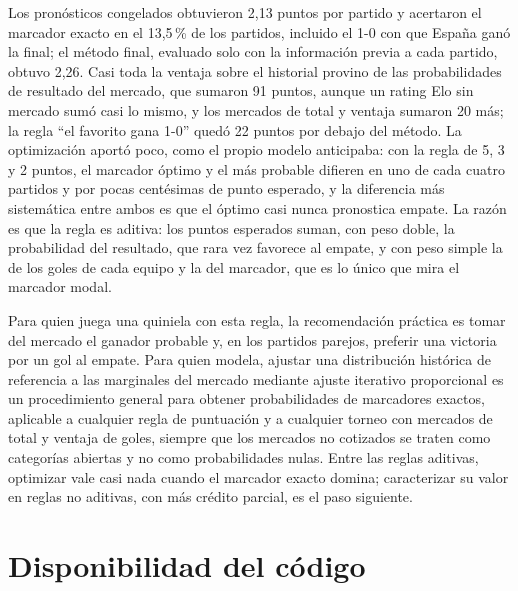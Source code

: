 \documentclass[12pt]{article}
\theoremstyle{plain}
\theoremstyle{remark}
\begin{document}
Los pronósticos congelados obtuvieron 2,13 puntos por partido y
acertaron el marcador exacto en el 13,5\,\% de los partidos, incluido
el 1-0 con que España ganó la final; el método final, evaluado solo
con la información previa a cada partido, obtuvo 2,26.
Casi toda la ventaja sobre el historial provino de las probabilidades
de resultado del mercado, que sumaron 91 puntos, aunque un rating Elo
sin mercado sumó casi lo mismo, y los mercados de total y ventaja
sumaron 20 más; la regla ``el favorito gana 1-0'' quedó 22 puntos por
debajo del método.
La optimización aportó poco, como el propio modelo anticipaba: con la
regla de 5, 3 y 2 puntos, el marcador óptimo y el más probable
difieren en uno de cada cuatro partidos y por pocas centésimas de
punto esperado,
y la diferencia más sistemática entre ambos es que el óptimo casi
nunca pronostica empate.
La razón es que la regla es aditiva: los puntos esperados suman, con
peso doble, la probabilidad del resultado, que rara vez favorece al
empate, y con peso simple la de los goles de cada equipo y la del
marcador, que es lo único que mira el marcador modal.

Para quien juega una quiniela con esta regla, la recomendación
práctica es tomar del mercado el ganador probable y, en los partidos
parejos, preferir una victoria por un gol al empate.
Para quien modela, ajustar una distribución histórica de referencia a
las marginales del mercado mediante ajuste iterativo proporcional es
un procedimiento general para obtener probabilidades de marcadores
exactos, aplicable a cualquier regla de puntuación y a cualquier
torneo con mercados de total y ventaja de goles, siempre que los
mercados no cotizados se traten como categorías abiertas y no como
probabilidades nulas.
Entre las reglas aditivas, optimizar vale casi nada cuando el marcador
exacto domina; caracterizar su valor en reglas no aditivas, con más
crédito parcial, es el paso siguiente.

\section*{Disponibilidad del código}
\end{document}
